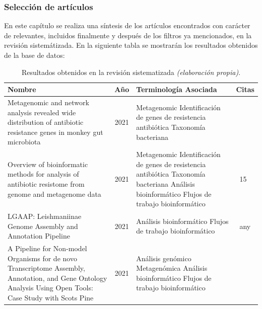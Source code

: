 \documentclass[12pt]{article}
\begin{document}
\subsubsection*{Selección de artículos}
En este capítulo se realiza una síntesis de los artículos 
encontrados con carácter de relevantes,  incluidos finalmente 
y después de los filtros ya mencionados, en la revisión 
sistemátizada. En la siguiente tabla se mostrarán los resultados 
obtenidos de la base de datos:

\begin{table}[htbp]
    \centering
    \caption{Resultados obtenidos en la revisión sistematizada \emph{(elaboración propia)}.}
    \label{tabla:resultados}
    \begin{tabularx}{\textwidth}{|>{\raggedright\arraybackslash}X|c|>{\raggedright\arraybackslash}X|>{\raggedright\arraybackslash}X|}
        \hline
        \textbf{Nombre} & \textbf{Año} & \textbf{Terminología Asociada} & \textbf{Citas} \\
        \hline
        Metagenomic and network analysis revealed wide distribution of antibiotic resistance genes in monkey gut microbiota
        & 2021 & Metagenomic \newline Identificación de genes de resistencia antibiótica \newline Taxonomía bacteriana & ~ \\
        \hline
        Overview of bioinformatic methods for analysis of antibiotic resistome from genome and metagenome data
        & 2021 & Metagenomic \newline Identificación de genes de resistencia antibiótica \newline Taxonomía bacteriana \newline Análisis bioinformático \newline Flujos de trabajo bioinformático & ~15 \\
        \hline
        LGAAP: Leishmaniinae Genome Assembly and Annotation Pipeline
        & 2021 & Análisis bioinformático \newline Flujos de trabajo bioinformático & ~any \\
        \hline
        A Pipeline for Non-model Organisms for de novo Transcriptome Assembly, Annotation, and Gene Ontology Analysis Using Open Tools: Case Study with Scots Pine
        & 2021 & Análisis genómico \newline Metagenómica \newline Análisis bioinformático \newline Flujos de trabajo bioinformático & ~ \\
        \hline
    \end{tabularx}
\end{table}
\end{document}
